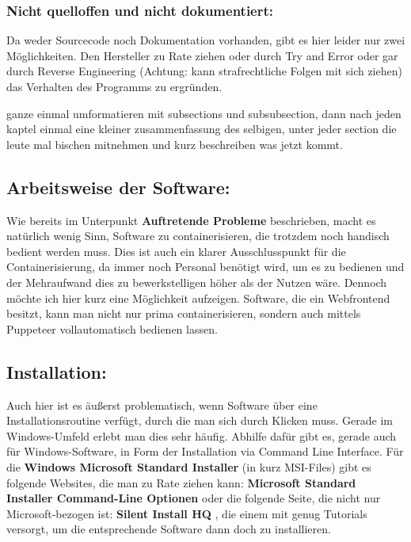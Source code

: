 \subsubsection{Nicht quelloffen und nicht dokumentiert:}
Da weder Sourcecode noch Dokumentation vorhanden, gibt es hier leider nur zwei Möglichkeiten.
Den Hersteller zu Rate ziehen oder durch Try and Error oder gar durch Reverse Engineering \cite{eilam2011reversing} (Achtung: kann strafrechtliche Folgen mit sich ziehen) das Verhalten des Programms zu ergründen.

ganze einmal umformatieren mit subsections und subsubsection, dann nach jeden kaptel einmal eine kleiner zusammenfassung des selbigen, unter jeder section die leute mal bischen mitnehmen und kurz beschreiben was jetzt kommt.

\subsection{Arbeitsweise der Software:}
Wie bereits im Unterpunkt \textbf{Auftretende Probleme} beschrieben, macht es natürlich wenig Sinn, Software zu containerisieren, die trotzdem noch handisch bedient werden muss.
Dies ist auch ein klarer Ausschlusspunkt für die Containerisierung, da immer noch Personal benötigt wird, um es zu bedienen und der Mehraufwand dies zu bewerkstelligen höher als der Nutzen wäre.
Dennoch möchte ich hier kurz eine Möglichkeit aufzeigen. Software, die ein Webfrontend besitzt, kann man nicht nur prima containerisieren, sondern auch mittels Puppeteer vollautomatisch bedienen lassen.

\subsection{Installation:}
Auch hier ist es äußerst problematisch, wenn Software über eine Installationsroutine verfügt, durch die man sich durch Klicken muss.
Gerade im Windows-Umfeld erlebt man dies sehr häufig. Abhilfe dafür gibt es, gerade auch für Windows-Software, in Form der Installation via Command Line Interface.
Für die \textbf{Windows Microsoft Standard Installer} (in kurz MSI-Files) gibt es folgende Websites, die man zu Rate ziehen kann: \textbf{Microsoft Standard Installer Command-Line Optionen} \cite{microsoft} oder die folgende Seite, die nicht nur Microsoft-bezogen ist: \textbf{Silent Install HQ} \cite{silent}, die einem mit genug Tutorials versorgt, um die entsprechende Software dann doch zu installieren.

